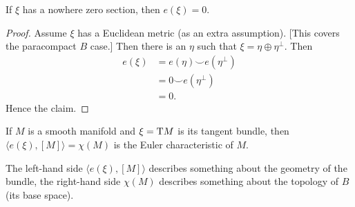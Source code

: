 \begin{node}[Property 6]
If $\xi$ has a nowhere zero section, then $e(\xi)=0$.
\end{node}

\begin{proof}
Assume $\xi$ has a Euclidean metric (as an extra assumption). [This
  covers the paracompact $B$ case.]
Then there is an $\eta$ such that $\xi=\eta\oplus\eta^{\perp}$. Then
\begin{subequations}
  \begin{align}
e(\xi) &= e(\eta)\smile e(\eta^{\perp})\\
&= 0\smile e(\eta^{\perp})\\
&= 0.
  \end{align}
\end{subequations}
Hence the claim.
\end{proof}

\begin{theorem}\label{thm:fall2026:math157a:very-important:lec18}
If $M$ is a smooth manifold and $\xi=\mathrm{T} M$ is its tangent bundle,
then $\langle e(\xi),[M]\rangle=\chi(M)$ is the Euler characteristic
of $M$.
\end{theorem}

The left-hand side $\langle e(\xi),[M]\rangle$ describes something
about the geometry of the bundle, the right-hand side $\chi(M)$
describes something about the topology of $B$ (its base space).